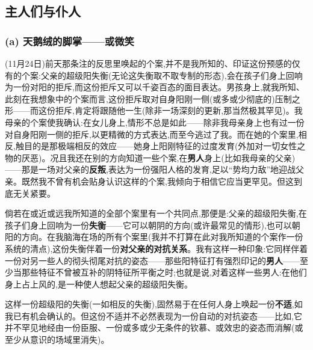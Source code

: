 \subsection{主人们与仆人}
\label{ch18:local:h43}

\subsubsection*{(a) 天鹅绒的脚掌——或微笑}
\label{ch18:local:h44}

\label{ch18:local:n39}

(11月24日)前天那条注的反思里唤起的个案,并不是我所知的、印证这份预感的仅有的个案:父亲的超级阳失衡(无论这失衡取不取专制的形态),会在孩子们身上回响为一份对阳的拒斥,而这份拒斥又可以千姿百态的面目表达。男孩身上,就我所知、此刻在我想象中的个案而言,这份拒斥取对自身阳刚一侧(或多或少彻底的)压制之形——而这份拒斥,肯定将跟随他一生(除非一场深刻的更新,那当然极其罕见)。我母亲的个案使我确认:在女儿身上,情形不总是如此——除非我母亲身上也有过一份对自身阳刚一侧的拒斥,以更精微的方式表达,而至今逃过了我。而在她的个案里,相反,触目的是那极端相反的效应——她身上阳刚特征的过度发育(外加对一切女性之物的厌恶)。况且我还在别的方向知道一些个案,在\textbf{男人}身上(比如我母亲的父亲)——那是一场对父亲的\textbf{反叛},表达为一份强阳人格的发育,足以“势均力敌”地迎战父亲。既然我不曾有机会贴身认识这样的个案,我倾向于相信它应当更罕见。但这到底无关紧要。

\dmark{}倘若在或近或远我所知道的全部个案里有一个共同点,那便是:父亲的超级阳失衡,在孩子们身上回响为一份\textbf{失衡}——它可以朝阴的方向(或许最常见的情形),也可以朝阳的方向。在我脑海在场的所有个案里(我并不打算在此对我所知道的个案作一份系统的清点),这份失衡伴着一份\textbf{对父亲的对抗关系}。我有这样一种印象:它同样伴着一份对另一些人的彻头彻尾对抗的姿态——那些阳特征打有强烈印记的\textbf{男人}——至少当那些特征不曾被互补的阴特征所平衡之时;也就是说,对着这样一些男人:在他们身上占上风的,是一种使人想起父亲的超级阳失衡。

这样一份超级阳的失衡(一如相反的失衡),固然易于在任何人身上唤起一份\textbf{不适},如我已有机会确认的。但这份不适并不必然表现为一份自动的对抗姿态——比如,它并不罕见地经由一份臣服、一份或多或少无条件的钦慕、或效忠的姿态而消解(或至少从意识的场域里消失)。

